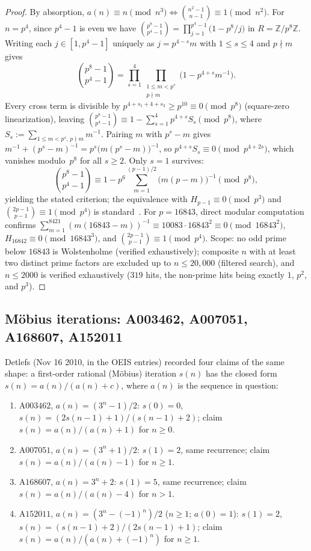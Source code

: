 \documentclass[11pt]{article}
\begin{document}
\begin{proof}
By absorption, $a(n) \equiv n \pmod{n^3} \iff \binom{n^2-1}{n-1} \equiv 1 \pmod{n^2}$. For $n = p^4$, since $p^4 - 1$ is even we have $\binom{p^8 - 1}{p^4 - 1} = \prod_{j=1}^{p^4 - 1} \bigl(1 - p^8/j\bigr)$ in $R = \mathbb{Z}/p^8\mathbb{Z}$. Writing each $j \in [1, p^4 - 1]$ uniquely as $j = p^{4-s} m$ with $1 \le s \le 4$ and $p \nmid m$ gives
\[
  \binom{p^8 - 1}{p^4 - 1} = \prod_{s=1}^{4} \prod_{\substack{1 \le m < p^s \\ p \nmid m}} \bigl(1 - p^{4+s} m^{-1}\bigr).
\]
Every cross term is divisible by $p^{4+s_1+4+s_2} \ge p^{10} \equiv 0 \pmod{p^8}$ (square-zero linearization), leaving $\binom{p^8 - 1}{p^4 - 1} \equiv 1 - \sum_{s=1}^{4} p^{4+s} S_s \pmod{p^8}$, where $S_s := \sum_{1 \le m < p^s,\, p \nmid m} m^{-1}$. Pairing $m$ with $p^s - m$ gives $m^{-1} + (p^s - m)^{-1} = p^s \bigl(m(p^s - m)\bigr)^{-1}$, so $p^{4+s} S_s \equiv 0 \pmod{p^{4+2s}}$, which vanishes modulo~$p^8$ for all $s \ge 2$. Only $s = 1$ survives:
\[
  \binom{p^8 - 1}{p^4 - 1} \equiv 1 - p^6 \sum_{m=1}^{(p-1)/2} \bigl(m(p-m)\bigr)^{-1} \pmod{p^8},
\]
yielding the stated criterion; the equivalence with $H_{p-1} \equiv 0 \pmod{p^3}$ and $\binom{2p-1}{p-1} \equiv 1 \pmod{p^4}$ is standard~\cite{McIntosh1995}. For $p = 16843$, direct modular computation confirms $\sum_{m=1}^{8421} (m(16843 - m))^{-1} \equiv 10083 \cdot 16843^2 \equiv 0 \pmod{16843^2}$, $H_{16842} \equiv 0 \pmod{16843^3}$, and $\binom{2p-1}{p-1} \equiv 1 \pmod{p^4}$. Scope: no odd prime below $16843$ is Wolstenholme (verified exhaustively); composite $n$ with at least two distinct prime factors are excluded up to $n \le 20{,}000$ (filtered search), and $n \le 2000$ is verified exhaustively ($319$ hits, the non-prime hits being exactly $1$, $p^2$, and $p^3$).
\end{proof}

\subsection{M\"obius iterations: A003462, A007051, A168607,
A152011}
\label{sec:mobius}
Detlefs (Nov 16 2010, in the OEIS entries) recorded four claims
of the same shape: a first-order rational (M\"obius) iteration
$s(n)$ has the closed form $s(n) = a(n)/(a(n) + c)$, where $a(n)$
is the sequence in question:
\begin{enumerate}
\item[(i)] $\mathrm{A003462}$, $a(n) = (3^n - 1)/2$: $s(0) = 0$,
  $s(n) = (2s(n-1)+1)/(s(n-1)+2)$; claim
  $s(n) = a(n)/(a(n)+1)$ for $n \ge 0$.
\item[(ii)] $\mathrm{A007051}$, $a(n) = (3^n + 1)/2$:
  $s(1) = 2$, same recurrence; claim $s(n) = a(n)/(a(n)-1)$ for
  $n \ge 1$.
\item[(iii)] $\mathrm{A168607}$, $a(n) = 3^n + 2$: $s(1) = 5$,
  same recurrence; claim $s(n) = a(n)/(a(n)-4)$ for $n > 1$.
\item[(iv)] $\mathrm{A152011}$, $a(n) = (3^n - (-1)^n)/2$
  ($n \ge 1$; $a(0) = 1$): $s(1) = 2$,
  $s(n) = (s(n-1)+2)/(2s(n-1)+1)$; claim
  $s(n) = a(n)/(a(n)+(-1)^n)$ for $n \ge 1$.
\end{enumerate}
\end{document}
